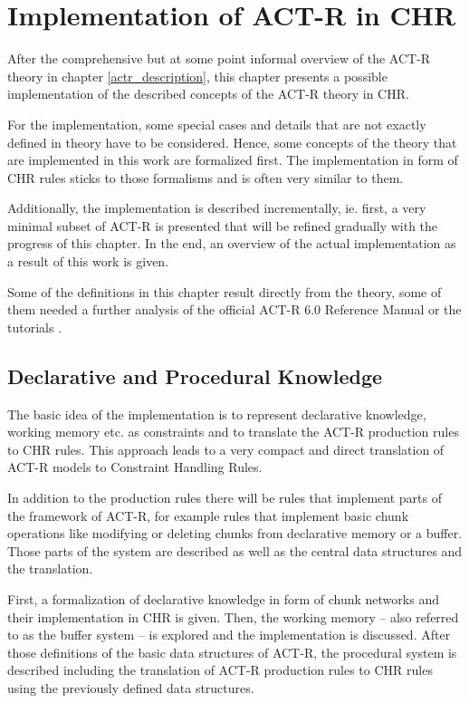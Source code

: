 \chapter{Implementation of ACT-R in CHR}

After the comprehensive but at some point informal overview of the ACT-R theory in chapter \ref{actr_description}, this chapter presents a possible implementation of the described concepts of the ACT-R theory in CHR.

For the implementation, some special cases and details that are not exactly defined in theory have to be considered. Hence, some concepts of the theory that are implemented in this work are formalized first. The implementation in form of CHR rules sticks to those formalisms and is often very similar to them.

Additionally, the implementation is described incrementally, ie. first, a very minimal subset of ACT-R is presented that will be refined gradually with the progress of this chapter. In the end, an overview of the actual implementation as a result of this work is given.

Some of the definitions in this chapter result directly from the theory, some of them needed a further analysis of the official ACT-R 6.0 Reference Manual \cite{actr_reference} or the tutorials \cite{actr_tutorial}. 

\section{Declarative and Procedural Knowledge}

The basic idea of the implementation is to represent declarative knowledge, working memory etc. as constraints and to translate the ACT-R production rules to CHR rules. This approach leads to a very compact and direct translation of ACT-R models to Constraint Handling Rules.

In addition to the production rules there will be rules that implement parts of the framework of ACT-R, for example rules that implement basic chunk operations like modifying or deleting chunks from declarative memory or a buffer. Those parts of the system are described as well as the central data structures and the translation.

First, a formalization of declarative knowledge in form of chunk networks and their implementation in CHR is given. Then, the working memory -- also referred to as the buffer system -- is explored and the implementation is discussed. After those definitions of the basic data structures of ACT-R, the procedural system is described including the translation of ACT-R production rules to CHR rules using the previously defined data structures.

